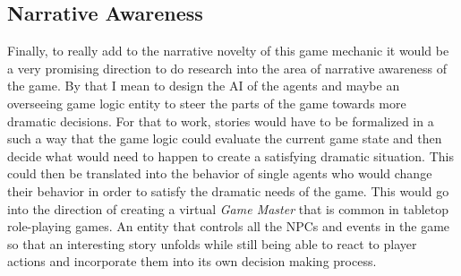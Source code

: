 \subsection{Narrative Awareness}
Finally, to really add to the narrative novelty of this game mechanic it would be a very promising direction to do research into the area of narrative awareness of the game. By that I mean to design the AI of the agents and maybe an overseeing game logic entity to steer the parts of the game towards more dramatic decisions. For that to work, stories would have to be formalized in a such a way that the game logic could evaluate the current game state and then decide what would need to happen to create a satisfying dramatic situation. This could then be translated into the behavior of single agents who would change their behavior in order to satisfy the dramatic needs of the game. This would go into the direction of creating a virtual \textit{Game Master} that is common in tabletop role-playing games. An entity that controls all the NPCs and events in the game so that an interesting story unfolds while still being able to react to player actions and incorporate them into its own decision making process.
